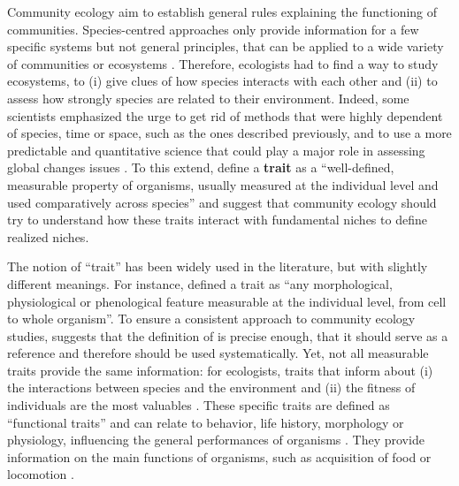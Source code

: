Community ecology aim to establish general rules explaining the functioning of communities. Species-centred approaches only provide information for a few specific systems but not general principles, that can be applied to a wide variety of communities or ecosystems \citep{albouy2011,martini2020}. Therefore, ecologists had to find a way to study ecosystems, to (i) give clues of how species interacts with each other and (ii) to assess how strongly species are related to their environment. Indeed, some scientists emphasized the urge to get rid of methods that were highly dependent of species, time or space, such as the ones described previously, and to use a more predictable and quantitative science that could play a major role in assessing global changes issues \citep{brindamour2011,mcgill2006,olden2002}. To this extend, \citet{mcgill2006} define a \textbf{trait} as a “well-defined, measurable property of organisms, usually measured at the individual level and used comparatively across species” and suggest that community ecology should try to understand how these traits interact with fundamental niches to define realized niches. 

The notion of ``trait'' has been widely used in the literature, but with slightly different meanings. For instance, \citet{violle2007} defined a trait as “any morphological, physiological or phenological feature measurable at the individual level, from cell to whole organism”. To ensure a consistent approach to community ecology studies, \citet{martini2020} suggests that the definition of \citet{violle2007} is precise enough, that it should serve as a reference and therefore should be used systematically. Yet, not all measurable traits provide the same information: for ecologists, traits that inform about (i) the interactions between species and the environment and (ii) the fitness of individuals are the most valuables \citep{kremer2017}. These specific traits are defined as “functional traits” and can relate to behavior, life history, morphology or physiology, influencing the general performances of organisms \citet{martini2020, mcgill2006}. They provide information on the main functions of organisms, such as acquisition of food or locomotion \citep{mejri2009}.

